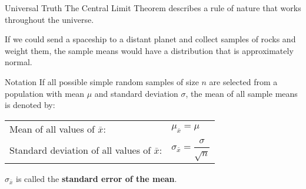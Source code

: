 \documentclass{beamer}
\begin{document}
\begin{frame}
\begin{block}{Universal Truth}
The Central Limit Theorem describes a rule of nature that works throughout the universe. 

\vspace{2mm}
If we could send a spaceship to a distant planet and collect samples of rocks and weight them, the sample means would have a distribution that is approximately normal.
\end{block}\pause

\begin{block}{Notation}
If all possible simple random samples of size $n$ are selected from a population with mean $\mu$ and standard deviation $\sigma$, the mean of all sample means is denoted by:
\begin{center}
\begin{tabular}{ll}
Mean of all values of $\bar{x}$: & $\mu_{\bar{x}}=\mu$ \\
Standard deviation of all values of $\bar{x}$: & $\sigma_{\bar{x}}=\dfrac{\sigma}{\sqrt{n}}$
\end{tabular}
\end{center}
\end{block}\pause

\begin{note}
$\sigma_{\bar{x}}$ is called the \textbf{standard error of the mean}.
\end{note}
\end{frame}
\end{document}
